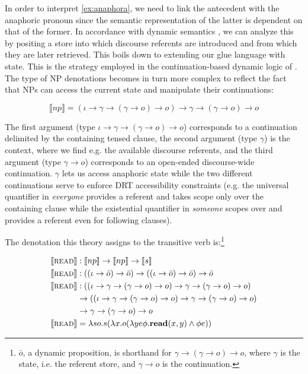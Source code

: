 \documentclass{article}
\newcommand{\sem}[1]{\llbracket #1 \rrbracket}
\begin{document}
In order to interpret \eqref{ex:anaphora}, we need to link the antecedent with
the anaphoric pronoun since the semantic representation of the latter is
dependent on that of the former. In accordance with dynamic semantics
\citep{kamp1993discourse}, we can analyze this by positing a store into which
discourse referents are introduced and from which they are later
retrieved. This boils down to extending our glue language with state. This is
the strategy employed in the continuation-based dynamic logic of
\citet{de2006towards}. The type of NP denotations becomes in turn more complex
to reflect the fact that NPs can access the current state and manipulate their
continuations:

\vspace{-1mm}

$$
\sem{np} = (\iota \to \gamma \to (\gamma \to o) \to o) \to \gamma \to (\gamma
\to o) \to o
$$

The first argument (type $\iota \to \gamma \to (\gamma \to o) \to o$)
corresponds to a continuation delimited by the containing tensed clause, the
second argument (type $\gamma$) is the context, where we find e.g. the
available discourse referents, and the third argument (type $\gamma \to o$)
corresponds to an open-ended discourse-wide continuation. $\gamma$ lets us
access anaphoric state while the two different continuations serve to enforce
DRT accessibility constraints \citep{kamp1993discourse} (e.g. the universal
quantifier in \emph{everyone} provides a referent and takes scope only over
the containing clause while the existential quantifier in \emph{someone}
scopes over and provides a referent even for following clauses).

The denotation this theory assigns to the transitive verb
is:\footnote{$\bar{o}$, a dynamic proposition, is shorthand for $\gamma \to
  (\gamma \to o) \to o$, where $\gamma$ is the state, i.e. the referent store,
  and $\gamma \to o$ is the continuation.}

\begin{align*}
  \sem{\textsc{read}} & : \sem{np} \to \sem{np} \to \sem{s} \\
  \sem{\textsc{read}} & : ((\iota \to \bar{o}) \to \bar{o}) \to
                          ((\iota \to \bar{o}) \to \bar{o}) \to
                          \bar{o} \\
  \sem{\textsc{read}} & : ((\iota \to \gamma \to (\gamma \to o) \to o)
                           \to \gamma \to (\gamma \to o) \to o) \\ & \to
                          ((\iota \to \gamma \to (\gamma \to o) \to o)
                           \to \gamma \to (\gamma \to o) \to o) \\ & \to
                           \gamma \to (\gamma \to o) \to o \\
  \sem{\textsc{read}} & = \lambda s o. s (\lambda x. o (\lambda y e
  \phi. \textbf{read}(x, y) \land \phi e))
\end{align*}
\end{document}
